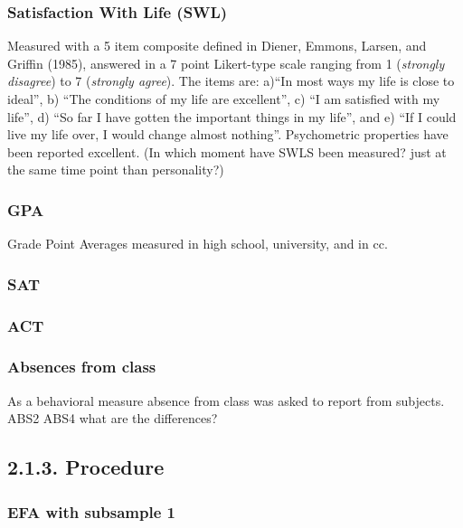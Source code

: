 \documentclass[,man,floatsintext]{apa6}
\begin{document}
\subsubsection{Satisfaction With Life
(SWL)}\label{satisfaction-with-life-swl}

Measured with a 5 item composite defined in Diener, Emmons, Larsen, and
Griffin (1985), answered in a 7 point Likert-type scale ranging from 1
(\emph{strongly disagree}) to 7 (\emph{strongly agree}). The items are:
a)\enquote{In most ways my life is close to ideal}, b) \enquote{The
conditions of my life are excellent}, c) \enquote{I am satisfied with my
life}, d) \enquote{So far I have gotten the important things in my
life}, and e) \enquote{If I could live my life over, I would change
almost nothing}. Psychometric properties have been reported excellent.
(In which moment have SWLS been measured? just at the same time point
than personality?)

\subsubsection{GPA}\label{gpa}

Grade Point Averages measured in high school, university, and in cc.

\subsubsection{SAT}\label{sat}

\subsubsection{ACT}\label{act}

\subsubsection{Absences from class}\label{absences-from-class}

As a behavioral measure absence from class was asked to report from
subjects. ABS2 ABS4 what are the differences?

\subsection{2.1.3. Procedure}\label{procedure}

\subsubsection{EFA with subsample 1}\label{efa-with-subsample-1}
\end{document}
